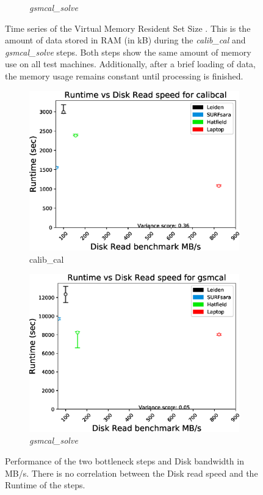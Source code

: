 \begin{figure}
\begin{subfigure}{.45\textwidth}
      \caption{\textit{gsmcal\_solve}}
	\label{ffig:fitclock_VMRSS}
 \end{subfigure}
 \caption{Time series of the Virtual Memory Resident Set Size . This is the amount of data stored in RAM (in kB) during the \textit{calib\_cal} and \textit{gsmcal\_solve} steps. Both steps show the same amount of memory use on all test machines. Additionally, after a brief loading of data, the memory usage remains constant until processing is finished. }
 \label{fig:VMRSS}
\end{figure}

\begin{figure}
  \centering
   \begin{subfigure}{.45\textwidth}
    \includegraphics[width=\textwidth]{ch4/figures/fig11/calibcal_HDD.eps}
      \caption{calib\_cal }
	\label{calib_cal_HDD}
 \end{subfigure}
  \begin{subfigure}{.45\textwidth}
    \includegraphics[width=\textwidth]{ch4/figures/fig11/GSMcal_HDD.eps}
      \caption{\textit{gsmcal\_solve}}
	\label{gsmcal_HDD}
 \end{subfigure}
 \label{fig:HDD_2_steps}
 \caption{Performance of the two bottleneck steps and Disk bandwidth in MB/s. There is no correlation between the Disk read speed and the Runtime of the steps.} 
\end{figure}


